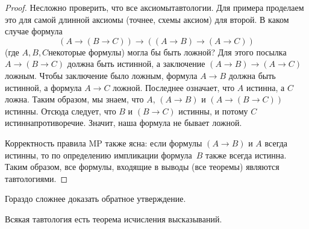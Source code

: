 \begin{proof}
Несложно проверить, что все аксиомы\т тавтологии. Для примера
проделаем это для самой длинной аксиомы (точнее, схемы аксиом)\т
для второй. В каком случае формула
        $$
(A\to(B\to C))\to((A\to B)\to (A\to C))
        $$
(где $A,B,C$\т некоторые формулы) могла бы быть ложной? Для
этого посылка $A\to(B\to C)$ должна быть истинной, а заключение
$(A\to B)\to (A\to C)$\т ложным. Чтобы заключение было ложным,
формула $A\to B$ должна быть истинной, а формула $A\to C$\т
ложной. Последнее означает, что $A$ истинна, а $C$ ложна. Таким
образом, мы знаем, что $A$, $(A\to B)$ и $(A\to(B\to C))$
истинны. Отсюда следует, что $B$ и $(B\to C)$ истинны,
и потому $C$
истинна\т противоречие. Значит, наша формула не бывает ложной.

Корректность правила MP также ясна: если формулы $(A\to B)$
и $A$ всегда истинны, то по определению импликации формула~$B$
также всегда истинна. Таким образом, все формулы, входящие в
выводы (все теоремы) являются тавтологиями.
\end{proof}

Гораздо сложнее доказать обратное утверждение.

\begin{theorem}[о полноте ИВ]
%
        \label{propositional-completeness}%
Всякая тавтология есть теорема исчисления высказываний.
\end{theorem}

